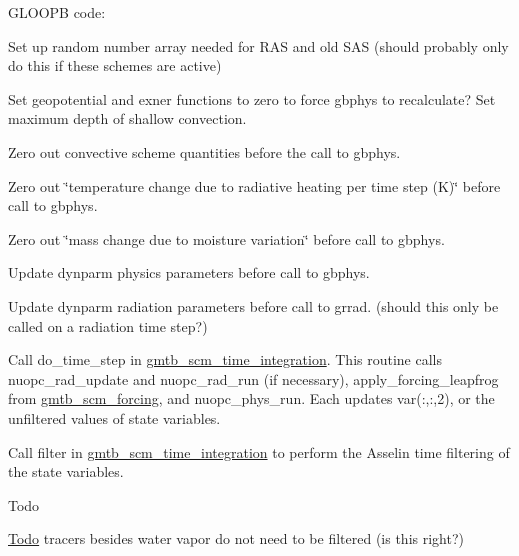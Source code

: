 \begin{DoxyItemize}
\begin{DoxyItemize}
\begin{DoxyItemize}
\begin{DoxyItemize}
\end{DoxyItemize}
\item G\+L\+O\+O\+PB code\+:
\begin{DoxyItemize}
\item Set up random number array needed for R\+AS and old S\+AS (should probably only do this if these schemes are active)
\item Set geopotential and exner functions to zero to force gbphys to recalculate? Set maximum depth of shallow convection.
\item Zero out convective scheme quantities before the call to gbphys.
\item Zero out \char`\"{}temperature change due to radiative heating per time step (\+K)\char`\"{} before call to gbphys.
\item Zero out \char`\"{}mass change due to moisture variation\char`\"{} before call to gbphys.
\item Update dynparm physics parameters before call to gbphys.
\end{DoxyItemize}
\end{DoxyItemize}
\item Update dynparm radiation parameters before call to grrad. (should this only be called on a radiation time step?)
\item Call do\+\_\+time\+\_\+step in \hyperlink{group__time__integration}{gmtb\+\_\+scm\+\_\+time\+\_\+integration}. This routine calls nuopc\+\_\+rad\+\_\+update and nuopc\+\_\+rad\+\_\+run (if necessary), apply\+\_\+forcing\+\_\+leapfrog from \hyperlink{group__forcing}{gmtb\+\_\+scm\+\_\+forcing}, and nuopc\+\_\+phys\+\_\+run. Each updates var(\+:,\+:,2), or the unfiltered values of state variables.
\item Call filter in \hyperlink{group__time__integration}{gmtb\+\_\+scm\+\_\+time\+\_\+integration} to perform the Asselin time filtering of the state variables.
\end{DoxyItemize}
\end{DoxyItemize}

\begin{DoxyRefDesc}{Todo}
\item[\hyperlink{todo__todo000012}{Todo}]tracers besides water vapor do not need to be filtered (is this right?) \end{DoxyRefDesc}



